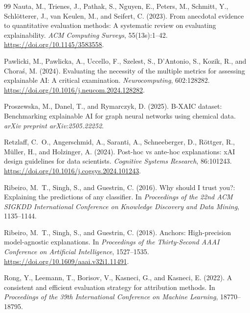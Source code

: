 \documentclass[twoside,11pt]{article}
\begin{document}
\begin{thebibliography}{99}
Nauta, M., Trienes, J., Pathak, S., Nguyen, E., Peters, M., Schmitt, Y.,
Schl\"{o}tterer, J., van Keulen, M., and Seifert, C. (2023).
From anecdotal evidence to quantitative evaluation methods: A systematic
review on evaluating explainability.
\emph{ACM Computing Surveys}, 55(13s):1--42.
\url{https://doi.org/10.1145/3583558}.

Pawlicki, M., Pawlicka, A., Uccello, F., Szelest, S., D'Antonio, S.,
Kozik, R., and Chora\'{s}, M. (2024).
Evaluating the necessity of the multiple metrics for assessing explainable
AI: A critical examination.
\emph{Neurocomputing}, 602:128282.
\url{https://doi.org/10.1016/j.neucom.2024.128282}.

Proszewska, M., Danel, T., and Rymarczyk, D. (2025).
B-XAIC dataset: Benchmarking explainable AI for graph neural networks
using chemical data.
\emph{arXiv preprint arXiv:2505.22252}.

Retzlaff, C.~O., Angerschmid, A., Saranti, A., Schneeberger, D.,
R\"{o}ttger, R., M\"{u}ller, H., and Holzinger, A. (2024).
Post-hoc vs ante-hoc explanations: xAI design guidelines for data
scientists.
\emph{Cognitive Systems Research}, 86:101243.
\url{https://doi.org/10.1016/j.cogsys.2024.101243}.

Ribeiro, M.~T., Singh, S., and Guestrin, C. (2016).
Why should I trust you?: Explaining the predictions of any classifier.
In \emph{Proceedings of the 22nd ACM SIGKDD International Conference on
Knowledge Discovery and Data Mining}, 1135--1144.

Ribeiro, M.~T., Singh, S., and Guestrin, C. (2018).
Anchors: High-precision model-agnostic explanations.
In \emph{Proceedings of the Thirty-Second AAAI Conference on Artificial
Intelligence}, 1527--1535.
\url{https://doi.org/10.1609/aaai.v32i1.11491}.

Rong, Y., Leemann, T., Borisov, V., Kasneci, G., and Kasneci, E. (2022).
A consistent and efficient evaluation strategy for attribution methods.
In \emph{Proceedings of the 39th International Conference on Machine
Learning}, 18770--18795.


\end{thebibliography}
\end{document}
